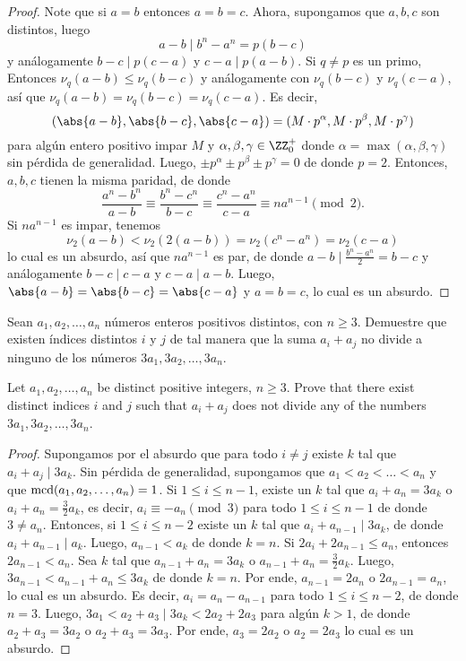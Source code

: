 \begin{proof}
	Note que si $a=b$ entonces $a=b=c$. Ahora, supongamos que $a,b,c$ son distintos, luego
	\[a-b\mid b^n-a^n=p(b-c)\]
	y análogamente $b-c\mid p(c-a)$ y $c-a\mid p(a-b)$. Si $q\ne p$ es un primo, Entonces $\nu_q(a-b)\le\nu_q(b-c)$ y análogamente con $\nu_q(b-c)$ y $\nu_q(c-a)$, así que $\nu_q(a-b)=\nu_q(b-c)=\nu_q(c-a)$. Es decir,
	\[(\abs{a-b},\abs{b-c},\abs{c-a})=(M\cdot p^\alpha,M\cdot p^\beta,M\cdot p^\gamma)\]
	para algún entero positivo impar $M$ y $\alpha,\beta,\gamma\in\ZZ^+_0$ donde $\alpha=\max(\alpha,\beta,\gamma)$ sin pérdida de generalidad. Luego, $\pm p^\alpha\pm p^\beta\pm p^\gamma=0$ de donde $p=2$. Entonces, $a,b,c$ tienen la misma paridad, de donde
	\[\frac{a^n-b^n}{a-b}\equiv\frac{b^n-c^n}{b-c}\equiv\frac{c^n-a^n}{c-a}\equiv na^{n-1}\pmod 2.\]
	Si $na^{n-1}$ es impar, tenemos
	\[\nu_2(a-b)<\nu_2(2(a-b))=\nu_2(c^n-a^n)=\nu_2(c-a)\]
	lo cual es un absurdo, así que $na^{n-1}$ es par, de donde
	$a-b\mid\frac{b^n-a^n}{2}=b-c$ y análogamente $b-c\mid c-a$ y $c-a\mid a-b$. Luego, $\abs{a-b}=\abs{b-c}=\abs{c-a}$ y $a=b=c$, lo cual es un absurdo.
\end{proof}

\begin{probEG}[ISL 2008/N2]
	Sean $a_1,a_2,\dots,a_n$ números enteros positivos distintos, con $n\ge 3$. Demuestre que existen índices distintos $i$ y $j$ de tal manera que la suma $a_i+a_j$ no divide a ninguno de los números $3a_1,3a_2,\dots,3a_n$.
	\begin{hint}
		Let $a_1,a_2,\dots,a_n$ be distinct positive integers, $n\ge 3$. Prove that there exist distinct indices $i$ and $j$ such that $a_i+a_j$ does not divide any of the numbers $3a_1,3a_2,\dots,3a_n$.
	\end{hint}
\end{probEG}

\begin{proof}
	Supongamos por el absurdo que para todo $i\ne j$ existe $k$ tal que $a_i+a_j\mid 3a_k$. Sin pérdida de generalidad, supongamos que $a_1<a_2<\dots<a_n$ y que $\operatorname{mcd}(a_1,a_2,\dots,a_n)=1$. Si $1\le i\le n-1$, existe un $k$ tal que $a_i+a_n=3a_k$ o $a_i+a_n=\frac32a_k$, es decir, $a_i\equiv -a_n\pmod 3$ para todo $1\le i\le n-1$ de donde $3\ne a_n$. Entonces, si $1\le i\le n-2$ existe un $k$ tal que $a_i+a_{n-1}\mid 3a_k$, de donde $a_i+a_{n-1}\mid a_k$. Luego, $a_{n-1}<a_k$ de donde $k=n$. Si $2a_i+2a_{n-1}\le a_n$, entonces $2a_{n-1}<a_n$. Sea $k$ tal que $a_{n-1}+a_n=3a_k$ o $a_{n-1}+a_n=\frac32a_k$. Luego, $3a_{n-1}<a_{n-1}+a_n\le 3a_k$ de donde $k=n$. Por ende, $a_{n-1}=2a_n$ o $2a_{n-1}=a_n$, lo cual es un absurdo. Es decir, $a_i=a_n-a_{n-1}$ para todo $1\le i\le n-2$, de donde $n=3$. Luego, $3a_1<a_2+a_3\mid 3a_k<2a_2+2a_3$ para algún $k>1$, de donde $a_2+a_3=3a_2$ o $a_2+a_3=3a_3$. Por ende, $a_3=2a_2$ o $a_2=2a_3$ lo cual es un absurdo.
\end{proof}

